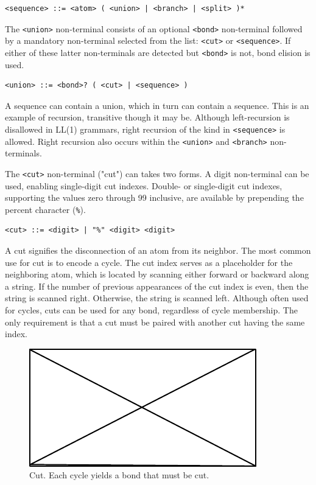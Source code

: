 \documentclass{article}
\def\ttt{\texttt}
\begin{document}
\begin{lstlisting}
<sequence> ::= <atom> ( <union> | <branch> | <split> )*
\end{lstlisting}

The \ttt{<union>} non-terminal consists of an optional \ttt{<bond>} non-terminal followed by a mandatory non-terminal selected from the list: \ttt{<cut>} or \ttt{<sequence>}. If either of these latter non-terminals are detected but \ttt{<bond>} is not, bond elision is used.

\begin{lstlisting}
<union> ::= <bond>? ( <cut> | <sequence> )
\end{lstlisting}

A sequence can contain a union, which in turn can contain a sequence. This is an example of recursion, transitive though it may be. Although left-recursion is disallowed in LL(1) grammars, right recursion of the kind in \ttt{<sequence>} is allowed. Right recursion also occurs within the \ttt{<union>} and \ttt{<branch>} non-terminals.

The \ttt{<cut>} non-terminal ("cut") can takes two forms. A digit non-terminal can be used, enabling single-digit cut indexes. Double- or single-digit cut indexes, supporting the values zero through 99 inclusive, are available by prepending the percent character (\ttt{\%}).

\begin{lstlisting}
<cut> ::= <digit> | "%" <digit> <digit>
\end{lstlisting}

A cut signifies the disconnection of an atom from its neighbor. The most common use for cut is to encode a cycle. The cut index serves as a placeholder for the neighboring atom, which is located by scanning either forward or backward along a string. If the number of previous appearances of the cut index is even, then the string is scanned right. Otherwise, the string is scanned left. Although often used for cycles, cuts can be used for any bond, regardless of cycle membership. The only requirement is that a cut must be paired with another cut having the same index.

\begin{figure}
    \centering
    \includegraphics{filler}
    \caption{Cut. Each cycle yields a bond that must be cut.}
    \label{fig:cut}
\end{figure}
\end{document}
